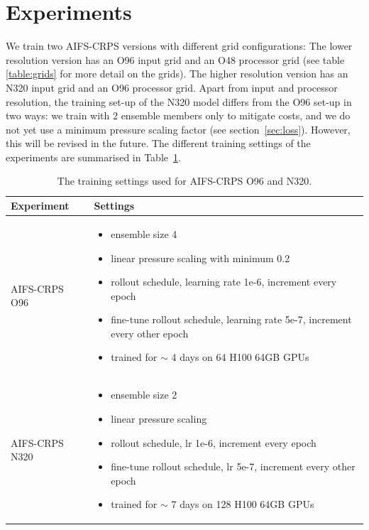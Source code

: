 \documentclass{article}
\begin{document}
\section{Experiments}\label{sec:experiments}
We train two AIFS-CRPS versions with different grid configurations: The lower resolution version has an O96 input grid and an O48 processor grid (see table \ref{table:grids} for more detail on the grids). The higher resolution version has an N320 input grid and an O96 processor grid. 
Apart from input and processor resolution, the training set-up of the N320 model differs from the O96 set-up in two ways: we train with 2 ensemble members only to mitigate costs, and we do not yet use a minimum pressure scaling factor (see section~\ref{sec:loss}). However, this will be revised in the future. The different training settings of the experiments are summarised in Table~\ref{table:exps}.
\begin{table}[htbp]
    \centering
    \begin{tabular}{| m{2.8cm} | m{12cm} |}
        \hline
        \textbf{Experiment} & \textbf{Settings} \\ 
        \hline
        AIFS-CRPS O96 & 
        \begin{itemize}
            \item ensemble size 4
            \item linear pressure scaling with minimum 0.2
            \item rollout schedule, learning rate 1e-6, increment every epoch
            \item fine-tune rollout schedule, learning rate 5e-7, increment every other epoch
            \item trained for $\sim$ 4 days on 64 H100 64GB GPUs
        \end{itemize} \\
        \hline
        AIFS-CRPS N320 &
        \begin{itemize}
            \item ensemble size 2
            \item linear pressure scaling
            \item rollout schedule, lr 1e-6, increment every epoch
            \item fine-tune rollout schedule, lr 5e-7, increment every other epoch
            \item trained for $\sim$ 7 days on 128 H100 64GB GPUs
        \end{itemize} \\
        \hline
    \end{tabular}
    \caption{The training settings used for AIFS-CRPS O96 and N320.}
    \label{table:exps}
\end{table}
\end{document}
